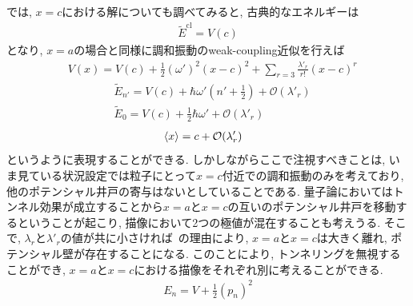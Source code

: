 \documentclass[dvipdfmx,11pt,a4paper,oneside,openany]{jsbook}
\begin{document}
では, $x=c$における解についても調べてみると, 古典的なエネルギーは
\begin{align}
    \tilde{E}^{\text{cl}}=V(c)
\end{align}
となり, $x=a$の場合と同様に調和振動のweak-coupling近似を行えば
\begin{align}
     & V(x)=V(c)+\frac{1}{2}(\omega')^2(x-c)^2+\sum_{r=3}\frac{\lambda'_r}{r!}(x-c)^r
\end{align}
\begin{subequations}
    \begin{align}
         & \tilde{E}_{n'}=V(c)+\hbar\omega'\left(n'+\frac{1}{2}\right)+\mathcal{O}(\lambda'_r) \\
         & \tilde{E}_{0}=V(c)+\frac{1}{2}\hbar\omega'+\mathcal{O}(\lambda'_r)
    \end{align}
\end{subequations}
\begin{align}
     & \braket{x}=c+\mathcal{O}(\lambda'_r)
\end{align}
というように表現することができる. しかしながらここで注視すべきことは, いま見ている状況設定では粒子にとって$x=c$付近での調和振動のみを考えており, 他のポテンシャル井戸の寄与はないとしていることである. 量子論においてはトンネル効果が成立することから$x=a$と$x=c$の互いのポテンシャル井戸を移動するということが起こり, 描像において2つの極値が混在することも考えうる. そこで, $\lambda_r$と$\lambda'_r$の値が共に小さければ~の理由により, $x=a$と$x=c$は大きく離れ, ポテンシャル壁が存在することになる. このことにより, トンネリングを無視することができ, $x=a$と$x=c$における描像をそれぞれ別に考えることができる.
\begin{align}
    E_{n}=V+\frac{1}{2}\left(p_{n}\right)^{2}
\end{align}
\end{document}
